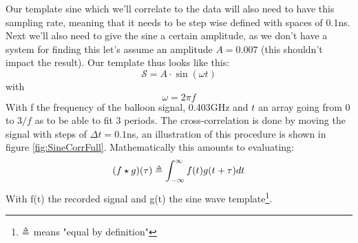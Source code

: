 Our template sine which we'll correlate to the data will also need to have this
sampling rate, meaning that it needs to be step wise defined with spaces of
0.1ns. Next we'll also need to give the sine a certain amplitude, as we don't
have a system for finding this let's assume an amplitude $A =0.007$ 
(this shouldn't impact the result).  Our template thus looks like this:
\begin{equation}
	\mathcal{S} = A\cdot\sin(\omega t) 
\end{equation}
with
\begin{equation}
	\omega = 2\pi f
\end{equation}
With f the frequency of the balloon signal, 0.403GHz and $t$ an array going
from 0 to $3/f$ as to be able to fit 3 periods. The
cross-correlation is done by moving the signal with steps of $\Delta t = 0.1$ns,
an illustration of this procedure is shown in figure \ref{fig:SineCorrFull}. Mathematically this
amounts to evaluating\cite{Bracewell1966TheFT}:
\begin{equation}
  (f\star g)(\tau) \delequal \int_{-\infty}^\infty f(t)g(t+\tau)dt
\end{equation}
With f(t) the recorded signal and g(t) the sine wave template\footnote{$\delequal$ means "equal by definition"}.

